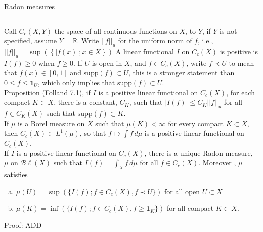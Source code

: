 \documentclass[12pt]{article}
\newcommand{ \cf }[1] { \mathbf{1}_{#1} }
\newcommand{\reals}[0] { \mathbb{R}}
\newcommand{\Bl}[0] { \mathcal{B} \ell }
\newcommand{ \supp } { \textrm{supp} }
\newcommand{ \SUP }[1] { \sup \left( \left\{ #1 \right\} \right) }
\begin{document}
\break

\begin{flushleft}
Radon measures\\
\end{flushleft}

\hrule

\vspace{0.5in}


Call $C_c(X,Y)$ the space of all continuous functions on $X$, to $Y$, if $Y$ is not specified, assume $Y = \reals$. Write $||f||_u$ for the uniform norm of $f$, i.e., $||f||_u = \SUP{ |f(x)|; x \in X }$ A linear functional $I$ on $C_c(X)$ is positive is $I(f) \ge 0$ when $f \ge 0$. If $U$ is open in $X$, and $f \in C_c(X)$, write $f \prec U$ to mean that $f(x) \in [0,1]$ and $\supp(f) \subset U$, this is a stronger statement than $0 \le f \le \cf{U}$, which only implies that $\supp(f) \subset \overline{U}$. \\



Proposition (Folland 7.1), if $I$ is a positive linear functional on $C_c(X)$, for each compact $K \subset X$, there is a constant, $C_K$, such that $|I(f)| \le C_K ||f||_u$ for all $f \in C_K(X)$ such that $\supp(f) \subset K$. \\

If $\mu$ is a Borel measure on $X$ such that $\mu(K) < \infty$ for every compact $K \subset X$, then $C_c(X) \subset L^1(\mu)$, so that $ f \mapsto \int f \, d\mu$ is a positive linear functional on $C_c(X)$. \\



If $I$ is a positive linear functional on $C_c(X)$, there is a unique Radon measure, $\mu$ on $\Bl(X)$ such that $I(f) = \int_X f \, d\mu$ for all $f \in C_c(X)$. Moreover , $\mu$ satisfies

\begin{enumerate}[a)]
\item
$\mu(U) = \sup \left( \{ I(f); f\in C_c(X), f \prec U  \} \right) $ for all open $U \subset X$
\item
$\mu(K) = \inf \left( \{ I(f); f \in C_c(X), f \ge \cf{K} \}\right) $ for all compact $K \subset X$.
\end{enumerate}

\noindent
Proof: ADD
\end{document}
